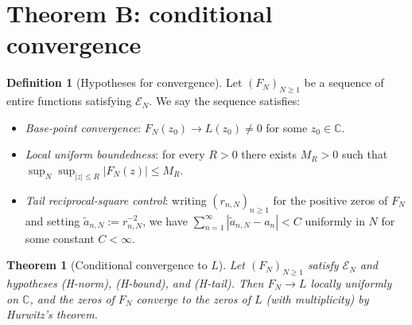 \documentclass[12pt]{amsart}
\theoremstyle{definition}
\newtheorem{definition}{Definition}[section]
\theoremstyle{remark}
\theoremstyle{plain}
\newtheorem{mainthm}{Theorem}
\newcommand{\CC}{\mathbb{C}}
\begin{document}
\section{Theorem B: conditional convergence}
\label{sec:pos}

\begin{definition}[Hypotheses for convergence]
\label{def:hypotheses}
Let $(F_N)_{N\geq 1}$ be a sequence of entire functions satisfying
$\mathcal{E}_N$.  We say the sequence satisfies:
\begin{itemize}
\item[(H-norm)] \emph{Base-point convergence}: $F_N(z_0)\to L(z_0)\neq 0$
  for some $z_0\in\CC$.
\item[(H-bound)] \emph{Local uniform boundedness}: for every $R>0$ there
  exists $M_R>0$ such that $\sup_N\sup_{|z|\leq R}|F_N(z)|\leq M_R$.
\item[(H-tail)] \emph{Tail reciprocal-square control}: writing
  $(r_{n,N})_{n\geq 1}$ for the positive zeros of $F_N$ and setting
  $\tilde{a}_{n,N}:=r_{n,N}^{-2}$, we have
  $\sum_{n=1}^{\infty}|\tilde{a}_{n,N}-a_n|<C$ uniformly in $N$ for some
  constant $C<\infty$.
\end{itemize}
\end{definition}

\begin{mainthm}[Conditional convergence to $L$]
\label{thm:pos}
Let $(F_N)_{N\geq 1}$ satisfy $\mathcal{E}_N$ and hypotheses
\textup{(H-norm)}, \textup{(H-bound)}, and \textup{(H-tail)}.
Then $F_N\to L$ locally uniformly on $\CC$, and the zeros of $F_N$
converge to the zeros of $L$ \textup{(}with multiplicity\textup{)} by
Hurwitz's theorem.
\end{mainthm}
\end{document}
